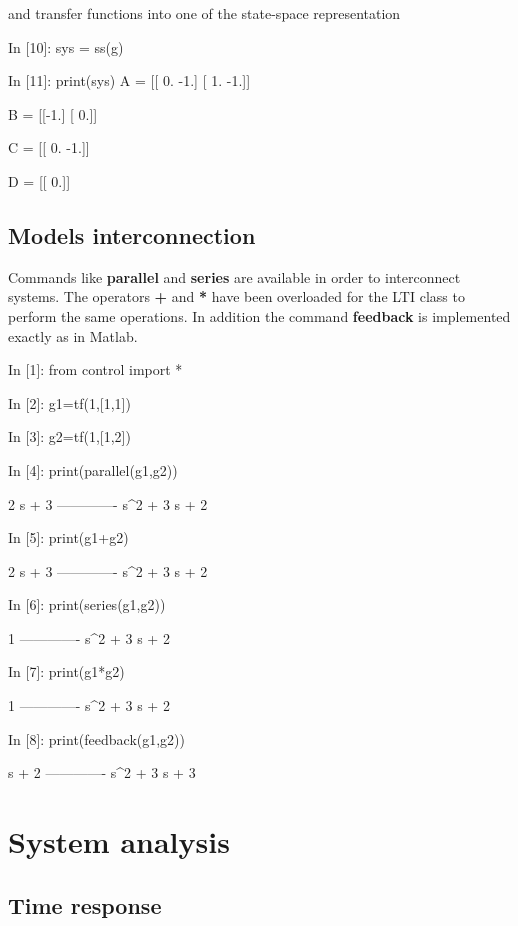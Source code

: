 and transfer functions into one of the  state-space representation

\begin{code}
In [10]: sys = ss(g)

In [11]: print(sys)
A = [[ 0. -1.]
 [ 1. -1.]]

B = [[-1.]
 [ 0.]]

C = [[ 0. -1.]]

D = [[ 0.]]

\end{code}
\section{Models interconnection}

Commands like \textbf{parallel} and \textbf{series} are available in order to 
interconnect systems. The operators \textbf{+} and \textbf{*} have been 
overloaded for the LTI class to perform the same operations. In addition the 
command \textbf{feedback} is implemented exactly as in Matlab.

\begin{code}
In [1]: from control import *

In [2]: g1=tf(1,[1,1])

In [3]: g2=tf(1,[1,2])

In [4]: print(parallel(g1,g2))

   2 s + 3
-------------
s^2 + 3 s + 2


In [5]: print(g1+g2)

   2 s + 3
-------------
s^2 + 3 s + 2
\end{code}

\begin{code}
In [6]: print(series(g1,g2))

      1
-------------
s^2 + 3 s + 2


In [7]: print(g1*g2)

      1
-------------
s^2 + 3 s + 2
\end{code}

\begin{code}
In [8]: print(feedback(g1,g2))

    s + 2
-------------
s^2 + 3 s + 3
\end{code}

\chapter{System analysis}

\section{Time response}

